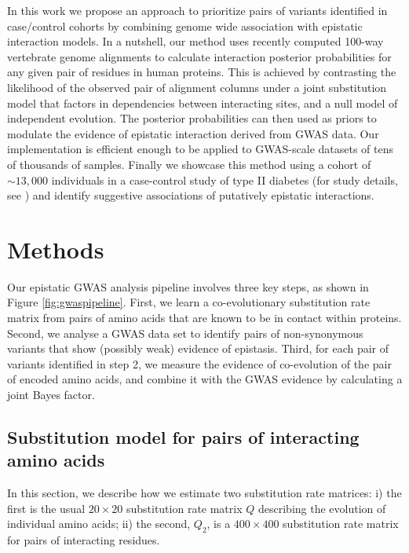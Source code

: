 In this work we propose an approach to prioritize pairs of variants identified in case/control cohorts by combining genome wide association with epistatic interaction models. 
In a nutshell, our method uses recently computed 100-way vertebrate genome alignments \cite{blanchette2004aligning} to calculate interaction posterior probabilities for any given pair of residues in human proteins. 
This is achieved by contrasting the likelihood of the observed pair of alignment columns under a joint substitution model that factors in dependencies between interacting sites, and a null model of independent evolution. 
The posterior probabilities can then used as priors to modulate the evidence of epistatic interaction derived from GWAS data. 
Our implementation is efficient enough to be applied to GWAS-scale datasets of tens of thousands of samples. 
Finally we showcase this method using a cohort of $\sim 13,000$ individuals in a case-control study of type II diabetes (for study details, see \cite{mccarthy2015T2D}) and identify suggestive associations of putatively epistatic interactions.

\section{Methods \label{sec:gwasMeth}}

Our epistatic GWAS analysis pipeline involves three key steps, as shown in Figure \ref{fig:gwaspipeline}. 
First, we learn a co-evolutionary substitution rate matrix from pairs of amino acids that are known to be in contact within proteins. 
Second, we analyse a GWAS data set to identify pairs of non-synonymous variants that show (possibly weak) evidence of epistasis. 
Third, for each pair of variants identified in step 2, we measure the evidence of co-evolution of the pair of encoded amino acids, and combine it with the GWAS evidence by calculating a joint Bayes factor.


\subsection{Substitution model for pairs of interacting amino acids \label{sec:gwasQ2}}

In this section, we describe how we estimate two substitution rate matrices:
i) the first is the usual $20 \times 20$ substitution rate matrix $Q$ describing the evolution of individual amino acids;
ii) the second, $Q_2$, is a $400 \times 400$ substitution rate matrix for pairs of interacting residues. 

